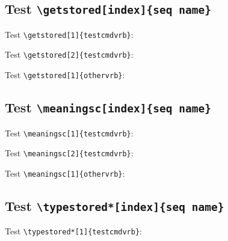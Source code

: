\documentclass{article}
\begin{document}
\subsection{Test \texttt{\textbackslash getstored[index]\{seq name\}}}

\noindent\hrulefill

Test \verb+\getstored[1]{testcmdvrb}+:\par


\noindent\hrulefill

Test \verb+\getstored[2]{testcmdvrb}+:\par


\noindent\hrulefill

Test \verb+\getstored[1]{othervrb}+:\par


\noindent\hrulefill

\subsection{Test \texttt{\textbackslash meaningsc[index]\{seq name\}}}

\noindent\hrulefill

Test \verb+\meaningsc[1]{testcmdvrb}+:\par


\noindent\hrulefill

Test \verb+\meaningsc[2]{testcmdvrb}+:\par


\noindent\hrulefill

Test \verb+\meaningsc[1]{othervrb}+:\par


\noindent\hrulefill

\subsection{Test \texttt{\textbackslash typestored*[index]\{seq name\}}}

\noindent\hrulefill

Test \verb+\typestored*[1]{testcmdvrb}+:\par
\end{document}
